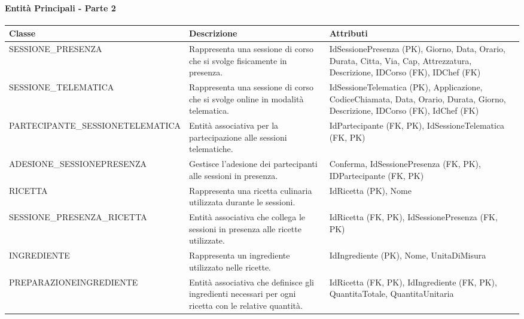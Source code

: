 \paragraph{Entità Principali - Parte 2}

\begin{center}
\begin{tcolorbox}[colback=white!98!gray, colframe=myblue!80!black, title=Dizionario delle Classi (Entità) - Parte 2, arc=4mm, boxrule=0.8pt, width=0.98\textwidth]
\renewcommand{\arraystretch}{1.2}
\begin{tabularx}{\textwidth}{p{3.2cm}p{4.8cm}X}
\textbf{Classe} & \textbf{Descrizione} & \textbf{Attributi} \\
\hline
SESSIONE\_\-PRESENZA & Rappresenta una sessione di corso che si svolge fisicamente in presenza. & IdSessionePresenza (PK), Giorno, Data, Orario, Durata, Citta, Via, Cap, Attrezzatura, Descrizione, IDCorso (FK), IDChef (FK) \\
\hline
SESSIONE\_\-TELEMATICA & Rappresenta una sessione di corso che si svolge online in modalità telematica. & IdSessioneTelematica (PK), Applicazione, CodiceChiamata, Data, Orario, Durata, Giorno, Descrizione, IDCorso (FK), IdChef (FK) \\
\hline
PARTECIPANTE\_\-SESSIONETE\-LEMATICA & Entità associativa per la partecipazione alle sessioni telematiche. & IdPartecipante (FK, PK), IdSessioneTelematica (FK, PK) \\
\hline
ADESIONE\_\-SESSIONEPRE\-SENZA & Gestisce l'adesione dei partecipanti alle sessioni in presenza. & Conferma, IdSessionePresenza (FK, PK), IDPartecipante (FK, PK) \\
\hline
RICETTA & Rappresenta una ricetta culinaria utilizzata durante le sessioni. & IdRicetta (PK), Nome \\
\hline
SESSIONE\_\-PRESENZA\_\-RICETTA & Entità associativa che collega le sessioni in presenza alle ricette utilizzate. & IdRicetta (FK, PK), IdSessionePresenza (FK, PK) \\
\hline
INGREDIENTE & Rappresenta un ingrediente utilizzato nelle ricette. & IdIngrediente (PK), Nome, UnitaDiMisura \\
\hline
PREPARAZIONE\-INGREDIENTE & Entità associativa che definisce gli ingredienti necessari per ogni ricetta con le relative quantità. & IdRicetta (FK, PK), IdIngrediente (FK, PK), QuantitaTotale, QuantitaUnitaria \\
\hline
\end{tabularx}
\end{tcolorbox}
\end{center}



